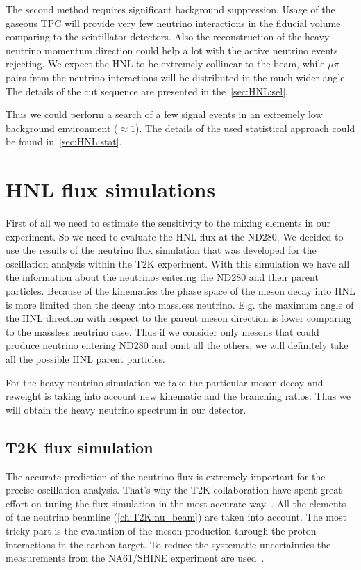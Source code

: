 \documentclass[../main.tex]{subfiles}
\begin{document}
The second method requires significant background suppression. Usage of the gaseous TPC will provide very few neutrino interactions in the fiducial volume comparing to the scintillator detectors. Also the reconstruction of the heavy neutrino momentum direction could help a lot with the active neutrino events rejecting. We expect the HNL to be extremely collinear to the beam, while $\mu\pi$ pairs from the neutrino interactions will be distributed in the much wider angle. The details of the cut sequence are presented in the~\autoref{sec:HNL:sel}.

Thus we could perform a search of a few signal events in an extremely low background environment ($\approx1$). The details of the used statistical approach could be found in~\autoref{sec:HNL:stat}.

\chapter{HNL flux simulations}
\label{ch:HNL:HNLsim}

First of all we need to estimate the sensitivity to the mixing elements in our experiment. So we need to evaluate the HNL flux at the ND280. We decided to use the results of the neutrino flux simulation that was developed for the oscillation analysis within the T2K experiment. With this simulation we have all the information about the neutrinos entering the ND280 and their parent particles. Because of the kinematics the phase space of the meson decay into HNL is more limited then the decay into massless neutrino. E.g. the maximum angle of the HNL direction with respect to the parent meson direction is lower comparing to the massless neutrino case. Thus if we consider only mesons that could produce neutrino entering ND280 and omit all the others, we will definitely take all the possible HNL parent particles.

For the heavy neutrino simulation we take the particular meson decay and reweight is taking into account new kinematic and the branching ratios. Thus we will obtain the heavy neutrino spectrum in our detector.

\section{T2K flux simulation}
The accurate prediction of the neutrino flux is extremely important for the precise oscillation analysis. That's why the T2K collaboration have spent great effort on tuning the flux simulation in the most accurate way~\cite{Abe2013}. All the elements of the neutrino beamline (\autoref{ch:T2K:nu_beam}) are taken into account. The most tricky part is the evaluation of the meson production through the proton interactions in the carbon target. To reduce the systematic uncertainties the measurements from the NA61/SHINE experiment are used~\cite{Collaboration2018}.
\end{document}
